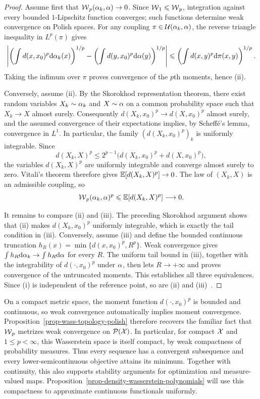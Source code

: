 \begin{proof}
	Assume first that $\operatorname{\mathcal{W}}_p(\alpha_k,\alpha)\to0$. Since $\operatorname{\mathcal{W}}_1\leqslant\operatorname{\mathcal{W}}_p$, integration against every bounded $1$-Lipschitz function converges; such functions determine weak convergence on Polish spaces. For any coupling $\pi\in\mathcal{U}(\alpha_k,\alpha)$, the reverse triangle inequality in $L^p(\pi)$ gives
	\[
		\left|
		\left(\int d(x,x_0)^p\mathrm{d}\alpha_k(x)\right)^{1/p}
		-
		\left(\int d(y,x_0)^p\mathrm{d}\alpha(y)\right)^{1/p}
		\right|
		\leqslant
		\left(\int d(x,y)^p\mathrm{d}\pi(x,y)\right)^{1/p}.
	\]
	Taking the infimum over $\pi$ proves convergence of the $p$th moments, hence (ii).

	Conversely, assume (ii). By the Skorokhod representation theorem, there exist random variables $X_k\sim\alpha_k$ and $X\sim\alpha$ on a common probability space such that $X_k\to X$ almost surely. Consequently $d(X_k,x_0)^p\to d(X,x_0)^p$ almost surely, and the assumed convergence of their expectations implies, by Scheff\'e's lemma, convergence in $L^1$. In particular, the family $(d(X_k,x_0)^p)_k$ is uniformly integrable. Since
	\[
		d(X_k,X)^p
		\leq 2^{p-1}\bigl(d(X_k,x_0)^p+d(X,x_0)^p\bigr),
	\]
	the variables $d(X_k,X)^p$ are uniformly integrable and converge almost surely to zero. Vitali's theorem therefore gives $\mathbb{E}[d(X_k,X)^p]\to0$. The law of $(X_k,X)$ is an admissible coupling, so
	\[
		\operatorname{\mathcal{W}}_p(\alpha_k,\alpha)^p\leqslant\mathbb{E}[d(X_k,X)^p]\longrightarrow0.
	\]

	It remains to compare (ii) and (iii). The preceding Skorokhod argument shows that (ii) makes $d(X_k,x_0)^p$ uniformly integrable, which is exactly the tail condition in (iii). Conversely, assume (iii) and define the bounded continuous truncation $h_R(x)=\min\{d(x,x_0)^p,R^p\}$. Weak convergence gives $\int h_R\mathrm{d}\alpha_k\to\int h_R\mathrm{d}\alpha$ for every $R$. The uniform tail bound in (iii), together with the integrability of $d(\cdot,x_0)^p$ under $\alpha$, then lets $R\to+\infty$ and proves convergence of the untruncated moments. This establishes all three equivalences. Since (i) is independent of the reference point, so are (ii) and (iii)~\cite{Villani09,SantambrogioBook,ambrosio2006gradient}.
\end{proof}

On a compact metric space, the moment function $d(\cdot,x_0)^p$ is bounded and continuous, so weak convergence automatically implies moment convergence. Proposition~\ref{prop-wass-topology-polish} therefore recovers the familiar fact that $\operatorname{\mathcal{W}}_p$ metrizes weak convergence on $\mathcal{P}(\mathcal{X})$. In particular, for compact $\mathcal{X}$ and $1\leq p<\infty$, this Wasserstein space is itself compact, by weak compactness of probability measures. Thus every sequence has a convergent subsequence and every lower-semicontinuous objective attains its minimum. Together with continuity, this also supports stability arguments for optimization and measure-valued maps. Proposition~\ref{prop-density-wasserstein-polynomials} will use this compactness to approximate continuous functionals uniformly.

